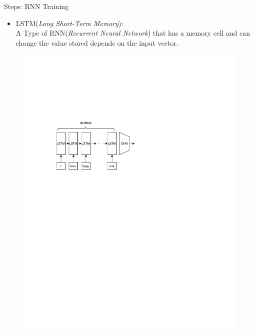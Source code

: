 \documentclass{beamer}
\begin{document}
\begin{frame}{Steps: RNN Training}
    \begin{itemize}
        \item LSTM(\textit{Long Short-Term Memory}):\\  
            A Type of RNN(\textit{Recurrent Neural Network}) that has a memory cell
                and can change the value stored depends on the input vector.
    \end{itemize}

    \begin{figure}[h]
        \begin{minipage}{0.7\textwidth}
            \includegraphics[trim={2cm 12cm 0 6cm},clip,width=7in]{img/rnn.pdf}
        \end{minipage}
        \begin{minipage}{0.29\textwidth}

\end{minipage}
\end{figure}
\end{frame}
\end{document}
